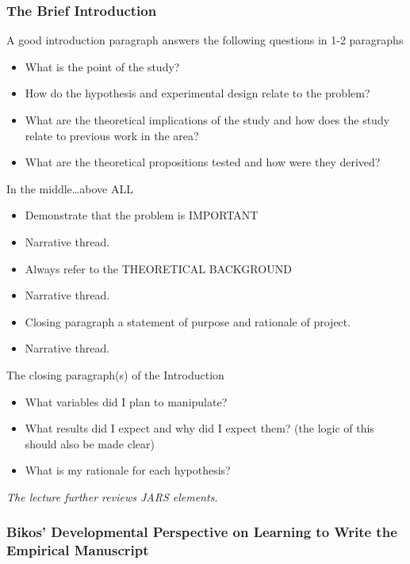 \documentclass[
  11pt,
]{book}
\providecommand{\tightlist}{%
  \setlength{\itemsep}{0pt}\setlength{\parskip}{0pt}}
\begin{document}
\hypertarget{the-brief-introduction}{%
\subsubsection{The Brief Introduction}\label{the-brief-introduction}}

A good introduction paragraph answers the following questions in 1-2 paragraphs

\begin{itemize}
\tightlist
\item
  What is the point of the study?
\item
  How do the hypothesis and experimental design relate to the problem?
\item
  What are the theoretical implications of the study and how does the study relate to previous work in the area?
\item
  What are the theoretical propositions tested and how were they derived?
\end{itemize}

In the middle\ldots above ALL

\begin{itemize}
\tightlist
\item
  Demonstrate that the problem is IMPORTANT
\item
  Narrative thread.
\item
  Always refer to the THEORETICAL BACKGROUND
\item
  Narrative thread.
\item
  Closing paragraph a statement of purpose and rationale of project.
\item
  Narrative thread.
\end{itemize}

The closing paragraph(s) of the Introduction

\begin{itemize}
\tightlist
\item
  What variables did I plan to manipulate?
\item
  What results did I expect and why did I expect them? (the logic of this should also be made clear)
\item
  What is my rationale for each hypothesis?
\end{itemize}

\emph{The lecture further reviews JARS elements.}

\hypertarget{bikos-developmental-perspective-on-learning-to-write-the-empirical-manuscript}{%
\subsubsection{Bikos' Developmental Perspective on Learning to Write the Empirical Manuscript}\label{bikos-developmental-perspective-on-learning-to-write-the-empirical-manuscript}}
\end{document}
